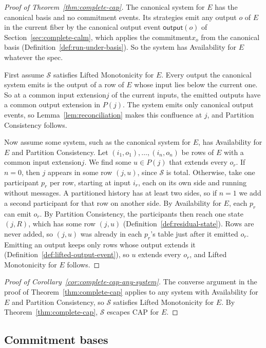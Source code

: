 \documentclass[sigconf]{cidr-2027}
\theoremstyle{remark}
\newcommand{\commitment}{commitment\xspace}
\newcommand{\Commitment}{Commitment\xspace}
\newcommand{\indesc}{input extension\xspace} %
\newcommand{\outrel}{extends\xspace}          %
\newcommand{\outnoun}{output extension\xspace}%
\newcommand{\Spec}{\mathcal{S}}
\newcommand{\fiber}[1]{P(#1)}
\begin{document}
\begin{proof}[Proof of Theorem~\ref{thm:complete-cap}]
The canonical system for $E$ has the canonical basis and no \commitment
events. Its strategies emit any output $o$ of $E$ in the current fiber by
the canonical output event $\mathsf{output}(o)$ of
Section~\ref{sec:complete-calm}, which applies the \commitment $x_o$ from the
canonical basis (Definition~\ref{def:run-under-basis}). So the system has
Availability for $E$ whatever the spec.

First assume $\Spec$ satisfies Lifted Monotonicity for $E$. Every output the
canonical system emits is the output of a row of $E$ whose input lies below
the current one. So at a common \indesc $j$ of the current inputs, the
emitted outputs have a common \outnoun in $\fiber{j}$. The system emits only
canonical output events, so Lemma~\ref{lem:reconciliation} makes this
confluence at $j$, and Partition Consistency follows.

Now assume some system, such as the canonical system for $E$, has
Availability for $E$ and Partition Consistency. Let
$(i_1,o_1),\ldots,(i_n,o_n)$ be rows of $E$ with a common \indesc $j$. We
find some $u\in\fiber{j}$ that \outrel every $o_r$. If $n=0$, then $j$
appears in some row $(j,u)$, since $\Spec$ is total. Otherwise, take one
participant $p_r$ per row, starting at input $i_r$, each on its own side and
running without messages. A partitioned history has at least two sides, so if
$n=1$ we add a second participant for that row on another side. By
Availability for $E$, each $p_r$ can emit $o_r$. By Partition Consistency,
the participants then reach one state $(j,R)$, which has some row $(j,u)$
(Definition~\ref{def:residual-state}). Rows are never added, so $(j,u)$ was
already in each $p_r$'s table just after it emitted $o_r$. Emitting an output
keeps only rows whose output \outrel it
(Definition~\ref{def:lifted-output-event}), so $u$ \outrel every $o_r$, and
Lifted Monotonicity for $E$ follows.
\end{proof}

\begin{proof}[Proof of Corollary~\ref{cor:complete-cap-any-system}]
The converse argument in the proof of Theorem~\ref{thm:complete-cap} applies
to any system with Availability for $E$ and Partition Consistency, so $\Spec$
satisfies Lifted Monotonicity for $E$. By Theorem~\ref{thm:complete-cap},
$\Spec$ escapes CAP for $E$.
\end{proof}

\subsection{\Commitment bases}
\label{app:bases}\label{app:commitment-bases}
\end{document}
